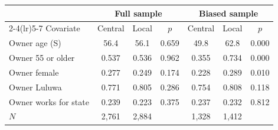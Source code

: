 \begin{tabular}{lcccccc}
\toprule
 & \multicolumn{3}{c}{Full sample} & \multicolumn{3}{c}{Biased sample}\\
\cmidrule(lr){2-4}\cmidrule(lr){5-7}
Covariate & Central & Local & $p$ & Central & Local & $p$\\
\midrule
Owner age (S) & 56.4 & 56.1 & 0.659 & 49.8 & 62.8 & 0.000\\
Owner 55 or older & 0.537 & 0.536 & 0.962 & 0.355 & 0.734 & 0.000\\
Owner female & 0.277 & 0.249 & 0.174 & 0.228 & 0.289 & 0.010\\
Owner Luluwa & 0.771 & 0.805 & 0.286 & 0.754 & 0.808 & 0.118\\
Owner works for state & 0.239 & 0.223 & 0.375 & 0.237 & 0.232 & 0.812\\
$N$ & 2,761 & 2,884 & & 1,328 & 1,412 & \\
\bottomrule
\end{tabular}
